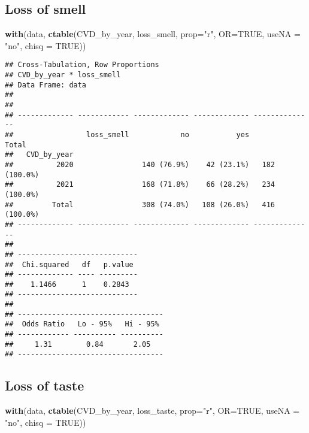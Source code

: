 \documentclass[
]{article}
\newenvironment{Shaded}{\begin{snugshade}}{\end{snugshade}}
\newcommand{\AttributeTok}[1]{\textcolor[rgb]{0.13,0.29,0.53}{#1}}
\newcommand{\ConstantTok}[1]{\textcolor[rgb]{0.56,0.35,0.01}{#1}}
\newcommand{\FunctionTok}[1]{\textcolor[rgb]{0.13,0.29,0.53}{\textbf{#1}}}
\newcommand{\NormalTok}[1]{#1}
\newcommand{\StringTok}[1]{\textcolor[rgb]{0.31,0.60,0.02}{#1}}
\begin{document}
\hypertarget{loss-of-smell}{%
\subsection{Loss of smell}\label{loss-of-smell}}

\begin{Shaded}
\begin{Highlighting}[]
\FunctionTok{with}\NormalTok{(data, }\FunctionTok{ctable}\NormalTok{(CVD\_by\_year, loss\_smell, }\AttributeTok{prop=}\StringTok{"r"}\NormalTok{, }\AttributeTok{OR=}\ConstantTok{TRUE}\NormalTok{, }\AttributeTok{useNA =} \StringTok{"no"}\NormalTok{, }\AttributeTok{chisq =} \ConstantTok{TRUE}\NormalTok{))}
\end{Highlighting}
\end{Shaded}

\begin{verbatim}
## Cross-Tabulation, Row Proportions  
## CVD_by_year * loss_smell  
## Data Frame: data  
## 
## 
## ------------- ------------ ------------- ------------- --------------
##                 loss_smell            no           yes          Total
##   CVD_by_year                                                        
##          2020                140 (76.9%)    42 (23.1%)   182 (100.0%)
##          2021                168 (71.8%)    66 (28.2%)   234 (100.0%)
##         Total                308 (74.0%)   108 (26.0%)   416 (100.0%)
## ------------- ------------ ------------- ------------- --------------
## 
## ----------------------------
##  Chi.squared   df   p.value 
## ------------- ---- ---------
##    1.1466      1    0.2843  
## ----------------------------
## 
## ----------------------------------
##  Odds Ratio   Lo - 95%   Hi - 95% 
## ------------ ---------- ----------
##     1.31        0.84       2.05   
## ----------------------------------
\end{verbatim}

\hypertarget{loss-of-taste}{%
\subsection{Loss of taste}\label{loss-of-taste}}

\begin{Shaded}
\begin{Highlighting}[]
\FunctionTok{with}\NormalTok{(data, }\FunctionTok{ctable}\NormalTok{(CVD\_by\_year, loss\_taste, }\AttributeTok{prop=}\StringTok{"r"}\NormalTok{, }\AttributeTok{OR=}\ConstantTok{TRUE}\NormalTok{, }\AttributeTok{useNA =} \StringTok{"no"}\NormalTok{, }\AttributeTok{chisq =} \ConstantTok{TRUE}\NormalTok{))}
\end{Highlighting}
\end{Shaded}
\end{document}
